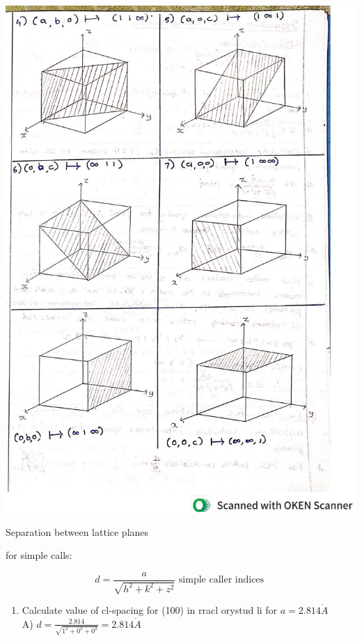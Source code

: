 \documentclass[10pt]{article}
\begin{document}
\begin{center}
\includegraphics[max width=\textwidth]{2024_06_16_30d750483617f1939202g-08}
\end{center}

Separation between lattice planes

for simple calls:

$$
d=\frac{a}{\sqrt{h^{2}+k^{2}+z^{2}}} \text { simple caller indices }
$$

\begin{enumerate}
  \item Calculate value of cl-spacing for (100) in rracl orystud li for $a=2.814 \dot{A}$\\
A) $d=\frac{2.814}{\sqrt{1^{2}+0^{2}+0^{2}}}=2.814 \dot{A}$
\end{enumerate}
\end{document}
